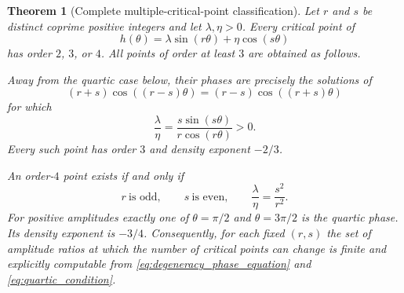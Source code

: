 \documentclass[11pt]{amsart}
\numberwithin{equation}{section}\setcounter{tocdepth}{3}\setcounter{secnumdepth}{3}
\newtheorem{theorem}{Theorem}[section]\newtheorem{proposition}[theorem]{Proposition}
\begin{document}
\begin{theorem}[Complete multiple-critical-point classification]
\label{thm:complete_degeneracy}
Let $r$ and $s$ be distinct coprime positive integers and let $\lambda,\eta>0$.
Every critical point of
\begin{equation}
 h(\theta)=\lambda\sin(r\theta)+\eta\cos(s\theta)
 \label{eq:degeneracy_h}
\end{equation}
has order $2$, $3$, or $4$.  All points of order at least $3$ are obtained as follows.

Away from the quartic case below, their phases are precisely the solutions of
\begin{equation}
 (r+s)\cos((r-s)\theta)
 =
 (r-s)\cos((r+s)\theta)
 \label{eq:degeneracy_phase_equation}
\end{equation}
for which
\begin{equation}
 \frac{\lambda}{\eta}
 =
 \frac{s\sin(s\theta)}{r\cos(r\theta)}>0.
 \label{eq:cubic_ratio}
\end{equation}
Every such point has order $3$ and density exponent $-2/3$.

An order-$4$ point exists if and only if
\begin{equation}
 r\ \text{is odd},\qquad s\ \text{is even},\qquad
 \frac{\lambda}{\eta}=\frac{s^2}{r^2}.
 \label{eq:quartic_condition}
\end{equation}
For positive amplitudes exactly one of $\theta=\pi/2$ and $\theta=3\pi/2$ is the
quartic phase.  Its density exponent is $-3/4$.  Consequently, for each fixed
$(r,s)$ the set of amplitude ratios at which the number of critical points can change is
finite and explicitly computable from \eqref{eq:degeneracy_phase_equation} and
\eqref{eq:quartic_condition}.
\end{theorem}
\end{document}
